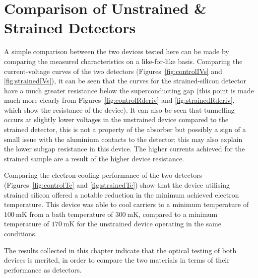 \section{Comparison of Unstrained \& Strained Detectors}
\label{sec:darkComparison}
A simple comparison between the two devices tested here can be made by comparing the measured characteristics on a like-for-like basis. Comparing the current-voltage curves of the two detectors (Figures~\ref{fig:controlIVs} and \ref{fig:strainedIVs}), it can be seen that the curves for the strained-silicon detector have a much greater resistance below the superconducting gap (this point is made much more clearly from Figures~\ref{fig:controlRderiv} and \ref{fig:strainedRderiv}, which show the resistance of the device). It can also be seen that tunnelling occurs at slightly lower voltages in the unstrained device compared to the strained detector, this is not a property of the absorber but possibly a sign of a small issue with the aluminium contacts to the detector; this may also explain the lower subgap resistance in this device. The higher currents achieved for the strained sample are a result of the higher device resistance.
\par 
Comparing the electron-cooling performance of the two detectors (Figures~\ref{fig:controlTe} and \ref{fig:strainedTe}) show that the device utilising strained silicon offered a notable reduction in the minimum achieved electron temperature. This device was able to cool carriers to a minimum temperature of $100~\mathrm{mK}$ from a bath temperature of $300~\mathrm{mK}$, compared to a minimum temperature of $170~\mathrm{mK}$ for the unstrained device operating in the same conditions. 
\par 
The results collected in this chapter indicate that the optical testing of both devices is merited, in order to compare the two materials in terms of their performance as detectors.

